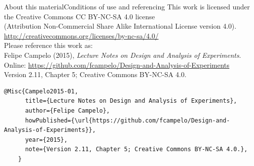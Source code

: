 \documentclass[t]{beamer}
\begin{document}

\begin{ftstf}{About this material}{Conditions of use and referencing}
\centering\footnotesize This work is licensed under the Creative Commons CC BY-NC-SA 4.0 license\\(Attribution Non-Commercial Share Alike International License version 4.0).\\
\vhalf
\url{http://creativecommons.org/licenses/by-nc-sa/4.0/}\\
\vone
\footnotesize Please reference this work as:\\
\footnotesize \flushleft Felipe Campelo (2015), \textit{Lecture Notes on Design and Analysis of Experiments}.\\Online: {\scriptsize\url{https://github.com/fcampelo/Design-and-Analysis-of-Experiments}}\\
Version 2.11, Chapter 5; Creative Commons BY-NC-SA 4.0.\\

\begin{Verbatim}[fontsize=\tiny]
    @Misc{Campelo2015-01,
      title={Lecture Notes on Design and Analysis of Experiments},
      author={Felipe Campelo},
      howPublished={\url{https://github.com/fcampelo/Design-and-Analysis-of-Experiments}},
      year={2015},
      note={Version 2.11, Chapter 5; Creative Commons BY-NC-SA 4.0.},
    }
\end{Verbatim}

\end{ftstf}
\end{document}
